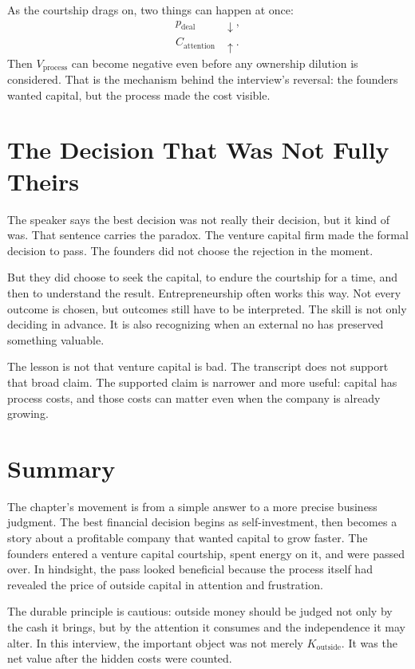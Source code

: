 As the courtship drags on, two things can happen at once:
\begin{align}
p_{\mathrm{deal}} &\downarrow,\\
C_{\mathrm{attention}} &\uparrow.
\end{align}
Then \(V_{\mathrm{process}}\) can become negative even before any ownership dilution is considered. That is the mechanism behind the interview's reversal: the founders wanted capital, but the process made the cost visible.

\section{The Decision That Was Not Fully Theirs}

The speaker says the best decision was not really their decision, but it kind of was. That sentence carries the paradox. The venture capital firm made the formal decision to pass. The founders did not choose the rejection in the moment.

But they did choose to seek the capital, to endure the courtship for a time, and then to understand the result. Entrepreneurship often works this way. Not every outcome is chosen, but outcomes still have to be interpreted. The skill is not only deciding in advance. It is also recognizing when an external no has preserved something valuable.

\begin{remark}
The lesson is not that venture capital is bad. The transcript does not support that broad claim. The supported claim is narrower and more useful: capital has process costs, and those costs can matter even when the company is already growing.
\end{remark}

\section{Summary}

The chapter's movement is from a simple answer to a more precise business judgment. The best financial decision begins as self-investment, then becomes a story about a profitable company that wanted capital to grow faster. The founders entered a venture capital courtship, spent energy on it, and were passed over. In hindsight, the pass looked beneficial because the process itself had revealed the price of outside capital in attention and frustration.

The durable principle is cautious: outside money should be judged not only by the cash it brings, but by the attention it consumes and the independence it may alter. In this interview, the important object was not merely \(K_{\mathrm{outside}}\). It was the net value after the hidden costs were counted.